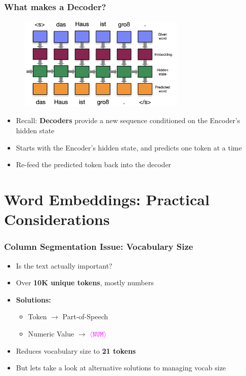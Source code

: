 \documentclass[usenames,dvipsnames]{beamer}
\begin{document}
\begin{frame}
\frametitle{What makes a Decoder?}
\begin{figure}
  \centering
  \includegraphics[width=8cm, valign=c]{assets/decoder}
\end{figure}
\begin{itemize}
  \item Recall: \textbf{Decoders} provide a new sequence conditioned on the Encoder's hidden state
  \item Starts with the Encoder's hidden state, and predicts one token at a time
  \item Re-feed the predicted token back into the decoder
\end{itemize}
\end{frame}


\section{Word Embeddings: Practical Considerations}

\begin{frame}
  \frametitle{Column Segmentation Issue: Vocabulary Size}
  \begin{itemize}
    \item Is the text actually important?
    \item Over \textbf{10K unique tokens}, mostly numbers
    \pause
    \item \textbf{Solutions:}
    \begin{itemize}
      \item Token $\rightarrow$ Part-of-Speech
      \item Numeric Value $\rightarrow$ \textcolor{Fuchsia}{$\langle \texttt{NUM} \rangle$}
    \end{itemize}
    \item Reduces vocabulary size to \textbf{21 tokens}
    \item But lets take a look at alternative solutions to managing vocab size
  \end{itemize}
\end{frame}
\end{document}
